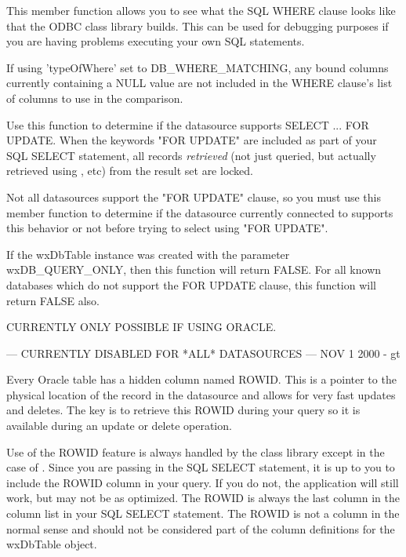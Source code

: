 
This member function allows you to see what the SQL WHERE clause looks like 
that the ODBC class library builds.  This can be used for debugging purposes
if you are having problems executing your own SQL statements.

If using 'typeOfWhere' set to DB\_WHERE\_MATCHING, any bound columns currently
containing a NULL value are not included in the WHERE clause's list of
columns to use in the comparison.


\label{wxdbtablecanselectforupdate}


Use this function to determine if the datasource supports SELECT ... FOR UPDATE.
When the keywords "FOR UPDATE" are included as part of your SQL SELECT statement,
all records {\it retrieved} (not just queried, but actually retrieved using 
, etc) from the result set are 
locked.  


Not all datasources support the "FOR UPDATE" clause, so you must use this
member function to determine if the datasource currently connected to supports
this behavior or not before trying to select using "FOR UPDATE".

If the wxDbTable instance was created with the parameter wxDB\_QUERY\_ONLY, then 
this function will return FALSE.  For all known databases which do not support 
the FOR UPDATE clause, this function will return FALSE also.


\label{wxdbtablecanupdatebyrowid}


CURRENTLY ONLY POSSIBLE IF USING ORACLE.  

--- CURRENTLY DISABLED FOR *ALL* DATASOURCES --- NOV 1 2000 - gt

Every Oracle table has a hidden column named ROWID.  This is a pointer to the
physical location of the record in the datasource and allows for very fast 
updates and deletes.  The key is to retrieve this ROWID during your query so
it is available during an update or delete operation. 

Use of the ROWID feature is always handled by the class library except in the 
case of .  Since 
you are passing in the SQL SELECT statement, 
it is up to you to include the ROWID column in your query.  If you do not, 
the application will still work, but may not be as optimized.  The ROWID is 
always the last column in the column list in your SQL SELECT statement.  
The ROWID is not a column in the normal sense and should not be considered 
part of the column definitions for the wxDbTable object.

